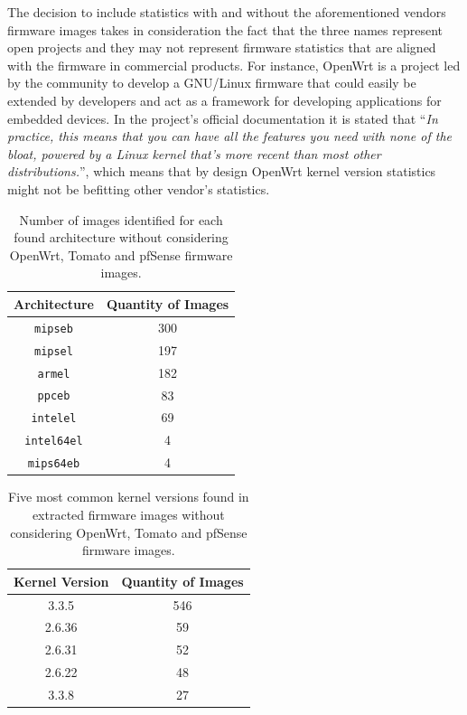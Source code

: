 The decision to include statistics with and without the aforementioned vendors firmware images takes in consideration the fact that the three names represent open projects and they may not represent firmware statistics that are aligned with the firmware in commercial products. For instance, OpenWrt is a project led by the community to develop a GNU/Linux firmware that could easily be extended by developers and act as a framework for developing applications for embedded devices. In the project's official documentation it is stated that ``\textit{In practice, this means that you can have all the features you need with none of the bloat, powered by a Linux kernel that's more recent than most other distributions.}'', which means that by design OpenWrt kernel version statistics might not be befitting other vendor's statistics.

\begin{table}[H]
\centering
\caption{Number of images identified for each found architecture without considering OpenWrt, Tomato and pfSense firmware images.}
\begin{tabular}{|c|c|}
\hline
\textbf{Architecture}       & \textbf{Quantity of Images} \\ \hline
{\tt mipseb}                &  300                        \\ 
{\tt mipsel}                &  197                        \\ 
{\tt armel}                 &  182                        \\ 
{\tt ppceb}                 &   83                        \\ 
{\tt intelel}               &   69                        \\ 
{\tt intel64el}             &    4                        \\ 
{\tt mips64eb}              &    4                        \\ \hline
\end{tabular}
\label{tab:arch-stats}
\end{table}

\begin{table}[H]
\centering
\caption{Five most common kernel versions found in extracted firmware images without considering OpenWrt, Tomato and pfSense firmware images.}
\begin{tabular}{|c|c|}
\hline
\textbf{Kernel Version} & \textbf{Quantity of Images} \\ \hline
3.3.5                  & 546                 \\ 
2.6.36                 &  59                 \\ 
2.6.31                 &  52                 \\ 
2.6.22                 &  48                 \\ 
3.3.8                  &  27                 \\ \hline
\end{tabular}
\label{tab:kernel-stats}
\end{table}

